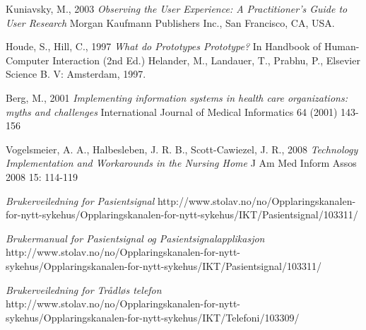 \documentclass[b5paper, 11pt, norsk]{MScthesisITEM}
\begin{document}
\begin{thebibliography}{99}
Kuniavsky, M., 2003 
\emph{Observing the User Experience: A Practitioner's Guide to User Research}
Morgan Kaufmann Publishers Inc., San Francisco, CA, USA.

Houde, S., Hill, C., 1997
\emph{What do Prototypes Prototype?}
In Handbook of Human-Computer Interaction (2nd Ed.)
Helander, M., Landauer, T., Prabhu, P.,
Elsevier Science B. V:
Amsterdam, 1997.

Berg, M., 2001
\emph{Implementing information systems in health care organizations: myths and challenges}
International Journal of Medical Informatics 64 (2001) 143-156

Vogelsmeier, A. A., Halbesleben, J. R. B., Scott-Cawiezel, J. R., 2008
\emph{Technology Implementation and Workarounds in the Nursing Home}
J Am Med Inform Assos 2008 15: 114-119

\emph{Brukerveiledning for Pasientsignal}
http://www.stolav.no/no/Opplaringskanalen-for-nytt-sykehus/Opplaringskanalen-for-nytt-sykehus/IKT/Pasientsignal/103311/

\emph{Brukermanual for Pasientsignal og Pasientsignalapplikasjon}
http://www.stolav.no/no/Opplaringskanalen-for-nytt-sykehus/Opplaringskanalen-for-nytt-sykehus/IKT/Pasientsignal/103311/

\emph{Brukerveiledning for Trådløs telefon}
http://www.stolav.no/no/Opplaringskanalen-for-nytt-sykehus/Opplaringskanalen-for-nytt-sykehus/IKT/Telefoni/103309/
\end{thebibliography}

\appendix
{}
 \renewcommand{\chaptername}{\appendixname}


\end{document}
